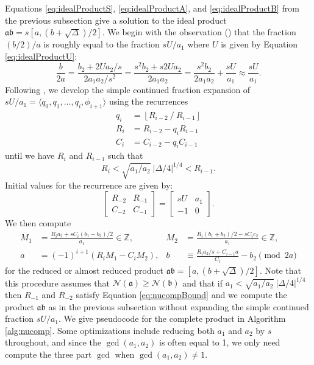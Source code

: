 \documentclass{ucalgthes1}
\theoremstyle{definition}
\newcommand{\ZZ}{\mathbb{Z}}
\newcommand{\matrixtt}[4]{\left[ \begin{array}{rr} #1 & #2 \\ #3 & #4 \end{array} \right]}
\newcommand{\floor}[1]{\left\lfloor #1 \right\rfloor}
\begin{document}
Equations \ref{eq:idealProductS}, \ref{eq:idealProductA}, and \ref{eq:idealProductB} from the previous subsection give a solution to the ideal product $\mathfrak a \mathfrak b = s[a, (b+\sqrt\Delta)/2]$.  We begin with the observation (\cite[p.119]{Jacobson2009}) that the fraction $(b/2)/a$ is roughly equal to the fraction $sU / a_1$ where $U$ is given by Equation \ref{eq:idealProductU}:
\[
	\frac{b}{2a} = \frac{b_2 + 2Ua_2/s}{2a_1a_2/s^2} 
	= \frac{s^2 b_2+s2Ua_2}{2a_1a_2}
	= \frac{s^2b_2}{2a_1a_2} + \frac{sU}{a_1}
	\approx \frac{sU}{a_1}.
\]
Following \cite[pp.120-121]{Jacobson2009}, we develop the simple continued fraction expansion of $sU/a_1 = \langle q_0, q_1, \dots, q_i, \phi_{i+1} \rangle$ using the recurrences
\begin{align*}
	q_i &= \floor{R_{i-2} ~/~ R_{i-1}} \\
	R_i &= R_{i-2} - q_i R_{i-1} \\
	C_i &= C_{i-2} - q_i C_{i-1}
\end{align*}
until we have $R_i$ and $R_{i-1}$ such that
\begin{equation}
\label{eq:nucompBound}
	R_i < \sqrt{a_1/a_2} ~ |\Delta/4|^{1/4} < R_{i-1}.
\end{equation}
Initial values for the recurrence are given by:
\[
	\matrixtt{R_{-2}}{R_{-1}}{C_{-2}}{C_{-1}} = \matrixtt{sU}{a_1}{-1}{0}.
\]
We then compute
\begin{align*}
	M_1 &= \frac{R_i a_2 + sC_i(b_1-b_2)/2}{a_1}  \in \ZZ, &
	M_2 &= \frac{R_i (b_1+b_2)/2 - s C_i c_2}{a_1} \in \ZZ, \\
	a &= (-1)^{i+1} (R_i M_1  - C_i M_2), &
	b &\equiv \frac{R_i a_2 /s + C_{i-1} a}{C_i} - b_2 \pmod{2a}
\end{align*}
for the reduced or almost reduced product $\mathfrak a \mathfrak b = [a, (b + \sqrt\Delta)/2]$.  Note that this procedure assumes that $\mathcal N(\mathfrak a) \ge \mathcal N(\mathfrak b)$ and that if $a_1 < \sqrt{a_1/a_2} ~ |\Delta/4|^{1/4}$ then $R_{-1}$ and $R_{-2}$ satisfy Equation \ref{eq:nucompBound} and we compute the product $\mathfrak a \mathfrak b$ as in the previous subsection without expanding the simple continued fraction $sU/a_1$.  We give pseudocode for the complete product in Algorithm \ref{alg:nucomp}. Some optimizations include reducing both $a_1$ and $a_2$ by $s$ throughout, and since the $\gcd(a_1, a_2)$ is often equal to 1, we only need compute the three part $\gcd$ when $\gcd(a_1, a_2) \neq 1$.
\end{document}
